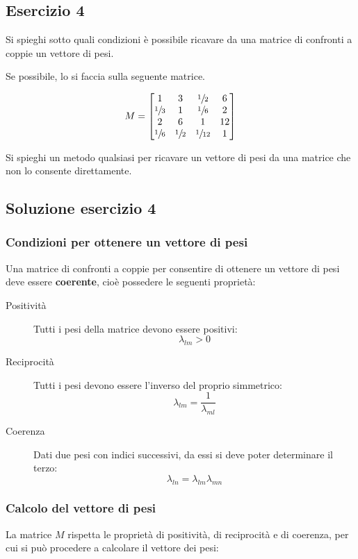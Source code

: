 \documentclass[\main/main.tex]{subfiles}
\begin{document}
\subsection{Esercizio 4}
Si spieghi sotto quali condizioni è possibile ricavare da una matrice di confronti a coppie un vettore di pesi.

Se possibile, lo si faccia sulla seguente matrice.

\[
  M = \begin{bmatrix}
    1            & 3            & \sfrac{1}{2}  & 6  \\
    \sfrac{1}{3} & 1            & \sfrac{1}{6}  & 2  \\
    2            & 6            & 1             & 12 \\
    \sfrac{1}{6} & \sfrac{1}{2} & \sfrac{1}{12} & 1
  \end{bmatrix}
\]

Si spieghi un metodo qualsiasi per ricavare un vettore di pesi da una matrice che non lo consente direttamente.

\subsection{Soluzione esercizio 4}
\subsubsection*{Condizioni per ottenere un vettore di pesi}
Una matrice di confronti a coppie per consentire di ottenere un vettore di pesi deve essere \textbf{coerente}, cioè possedere le seguenti proprietà:

\begin{description}
  \item[Positività] Tutti i pesi della matrice devono essere positivi:
        \[
          \lambda_{lm} > 0
        \]
  \item[Reciprocità] Tutti i pesi devono essere l'inverso del proprio simmetrico:
        \[
          \lambda_{lm} = \frac{1}{\lambda_{ml}}
        \]
  \item[Coerenza] Dati due pesi con indici successivi, da essi si deve poter determinare il terzo:
        \[
          \lambda_{ln} = \lambda_{lm}\lambda_{mn}
        \]
\end{description}

\subsubsection*{Calcolo del vettore di pesi}
La matrice $M$ rispetta le proprietà di positività, di reciprocità e di coerenza, per cui si può procedere a calcolare il vettore dei pesi:
\end{document}
